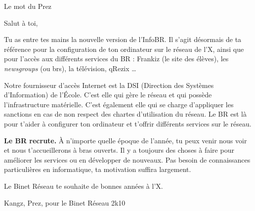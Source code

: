 

\begin{center}
    { \Huge Le mot du Prez }
\end{center}

 Salut \`a toi,

Tu as entre tes mains la nouvelle version de l'InfoBR. Il s'agit d\'esormais de ta r\'ef\'erence pour la configuration de ton ordinateur sur le r\'eseau de l'X, ainsi que pour l'acc\`es aux diff\'erents services du BR : Frankiz (le site des \'el\`eves), les \emph{newsgroups} (ou brs), la t\'el\'evision, qRezix \dots
{}

Notre fournisseur d'acc\`es Internet est la DSI (Direction des Syst\`emes d'Information) de l'\'Ecole. C'est elle qui g\`ere le r\'eseau et qui poss\`ede l'infrastructure mat\'erielle. C'est \'egalement elle qui se charge d'appliquer les sanctions en cas de non respect des chartes d'utilisation du r\'eseau. Le BR est l\`a pour t'aider \`a configurer ton ordinateur et t'offrir diff\'erents services sur le r\'eseau.

\textbf{Le BR recrute.} \`A n'importe quelle \'epoque de l'ann\'ee, tu peux venir nous voir et nous t'accueillerons \`a bras ouverts. Il y a toujours des choses \`a faire pour am\'eliorer les services ou en d\'evelopper de nouveaux. Pas besoin de connaissances particuli\`eres en informatique, ta motivation suffira largement.

Le Binet R\'eseau te souhaite de bonnes ann\'ees \`a l'X.\\

\begin{flushright}
    Kangz, Prez, pour le Binet R\'eseau 2k10 
\end{flushright}

